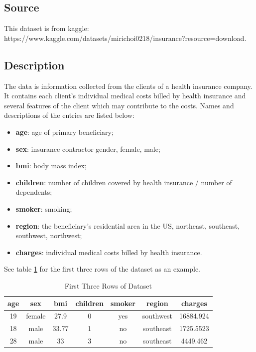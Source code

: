 \documentclass{article}
\begin{document}
\subsection{Source}
This dataset is from kaggle:
 https://www.kaggle.com/datasets/mirichoi0218/insurance?resource=download.
 
\subsection{Description}
The data is information collected from the clients of a health insurance company. It contains each client's individual medical costs billed by health insurance and several features of the client which may contribute to the costs. Names and descriptions of the entries are listed below:
\begin{itemize}
	\item \textbf{age}: age of primary beneficiary;
	\item \textbf{sex}: insurance contractor gender, female, male;
	\item \textbf{bmi}: body mass index;
	\item \textbf{children}: number of children covered by health insurance / number of dependents;
	\item \textbf{smoker}: smoking;
	\item \textbf{region}: the beneficiary's residential area in the US, northeast, southeast, southwest, northwest;
	\item \textbf{charges}: individual medical costs billed by health insurance.
\end{itemize}
See table \ref{tab:dataset} for the first three rows of the dataset as an example.
\begin{table}[h]
	\centering
	\begin{tabular}{|c|c|c|c|c|c|c|}
		\hline
		age & sex & bmi & children & smoker & region & charges \\
		\hline
		19 & female & 27.9 & 0 & yes & southwest & 16884.924 \\
		\hline
		18 & male & 33.77 & 1 & no & southeast & 1725.5523\\
		\hline
		28 & male & 33 & 3 & no & southeast & 4449.462 \\
		\hline
	\end{tabular}
	\caption{First Three Rows of Dataset}
	\label{tab:dataset}
\end{table}
\end{document}
